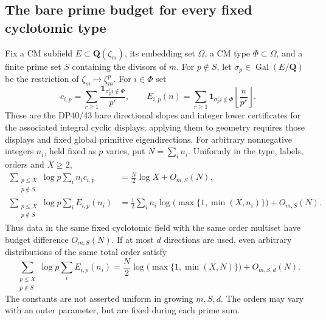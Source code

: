 \subsection{The bare prime budget for every fixed cyclotomic type}

\begin{theorem}\label{DP64}
Fix a CM subfield $E\subset\mathbf Q(\zeta_m)$, its embedding set
$\Omega$, a CM type $\Phi\subset\Omega$, and a finite prime set $S$
containing the divisors of $m$.
For $p\notin S$, let $\sigma_p\in\operatorname{Gal}(E/\mathbf Q)$
be the restriction of $\zeta_m\mapsto\zeta_m^p$.
For $i\in\Phi$ set
\[
 c_{i,p}=\sum_{r\ge1}\frac{\mathbf1_{\sigma_p^ri\notin\Phi}}{p^r},
 \qquad E_{i,p}(n)=\sum_{r\ge1}\mathbf1_{\sigma_p^ri\notin\Phi}
                     \left\lfloor\frac n{p^r}\right\rfloor.
\]
These are the DP40/43 bare directional slopes and integer lower
certificates for the associated integral cyclic displays; applying
them to geometry requires those displays and fixed global primitive
eigendirections.
For arbitrary nonnegative integers $n_i$, held fixed as $p$ varies,
put $N=\sum_i n_i$. Uniformly in the type, labels, orders and $X\ge2$,
\begin{align}
 \sum_{\substack{p\le X\\p\notin S}}\log p\sum_i n_i c_{i,p}
 &=\frac N2\log X+O_{m,S}(N),\label{eq:generalcmlinear}\\
 \sum_{\substack{p\le X\\p\notin S}}\log p\sum_i E_{i,p}(n_i)
 &=\frac12\sum_i n_i\log\bigl(\max\{1,\min(X,n_i)\}\bigr)
       +O_{m,S}(N).\label{eq:generalcmfloors}
\end{align}
Thus data in the same fixed cyclotomic field with the same order
multiset have budget difference $O_{m,S}(N)$.
If at most $d$ directions are used, even arbitrary distributions of
the same total order satisfy
\begin{equation}\label{eq:generalcmentropy}
 \sum_{\substack{p\le X\\p\notin S}}\log p\sum_i E_{i,p}(n_i)
 =\frac N2\log\bigl(\max\{1,\min(X,N)\}\bigr)
       +O_{m,S,d}(N).
\end{equation}
The constants are not asserted uniform in growing $m,S,d$.
The orders may vary with an outer parameter, but are fixed during
each prime sum.
\end{theorem}


